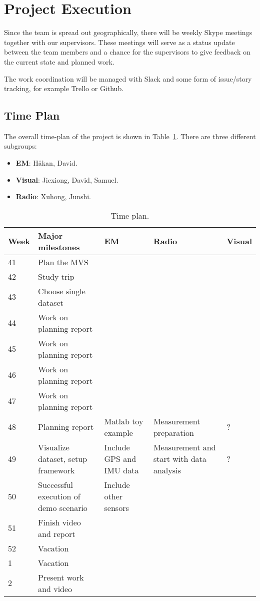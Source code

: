 \section{Project Execution}

Since the team is spread out geographically, there will be weekly Skype meetings together with our supervisors. These meetings will serve as a status update between the team members and a chance for the supervisors to give feedback on the current state and planned work.

The work coordination will be managed with Slack and some form of
issue/story tracking, for example Trello or Github.

\subsection{Time Plan}
The overall time-plan of the project is shown in Table~\ref{tab:1}. There are three different
subgroups:
\begin{itemize}
\item \textbf{EM}: H\aa kan, David.
\item \textbf{Visual}: Jiexiong, David, Samuel.
\item \textbf{Radio}: Xuhong, Junshi.
\end{itemize}

\begin{table}[t]
  \centering
    \caption{Time plan.}\label{tab:1}
    \begin{tabular}{ p{} | p{} | p{} | p{} |p{}}
    \hline
    \textbf{Week} & \textbf{Major milestones}
      & \textbf{EM }  & \textbf{Radio} & \textbf{Visual} \\
      \hline
    41 & Plan the \gls{MVS} \\ \hline
    42 & Study trip \\ \hline
    43 & Choose single dataset \\ \hline
    44 & Work on planning report  \\ \hline
    45 & Work on planning report  \\ \hline
    46 & Work on planning report  \\ \hline
      47 & Work on planning report  \\ \hline
      48 & Planning report & Matlab toy example & Measurement preparation & ? \\
      \hline
    49 & Visualize dataset, setup framework &  Include GPS and IMU
                                              data & Measurement and start with data analysis & ?\\
      \hline
    50 & Successful execution of demo scenario & Include other sensors
      \\
      \hline
      51 & Finish video and report \\
      \hline
      52 & Vacation \\
      \hline
      1 & Vacation \\
      \hline
    2 & Present work and video\\
    \hline
  \end{tabular}
\end{table}

\newpage



